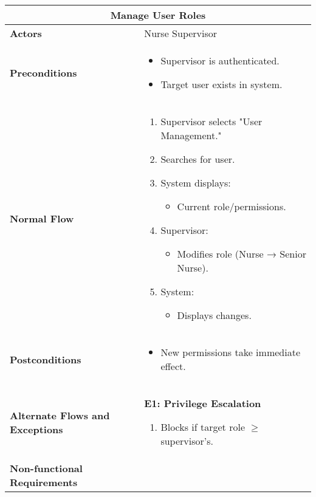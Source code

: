 \documentclass{article}
\begin{document}
\begin{longtable}{| p{5cm} | p{10cm} |}
    \hline
    \multicolumn{2}{|c|}{\textbf{Manage User Roles}} \\
    \hline
    \textbf{Actors} & Nurse Supervisor \\
    \hline
    \textbf{Preconditions} & 
    \begin{itemize}
        \item Supervisor is authenticated.
        \item Target user exists in system.
    \end{itemize} \\
    \hline
    \textbf{Normal Flow} & 
    \begin{enumerate}
        \item Supervisor selects "User Management."
        \item Searches for user.
        \item System displays:
        \begin{itemize}
            \item Current role/permissions.
        \end{itemize}
        \item Supervisor:
        \begin{itemize}
            \item Modifies role (Nurse → Senior Nurse).
        \end{itemize}
        \item System:
        \begin{itemize}
            \item Displays changes.
        \end{itemize}
    \end{enumerate} \\
    \hline
    \textbf{Postconditions} & 
    \begin{itemize}
        \item New permissions take immediate effect.
    \end{itemize} \\
    \hline
    \textbf{Alternate Flows and Exceptions} & 
    \textbf{E1: Privilege Escalation}  
    \begin{enumerate}
        \item Blocks if target role $\geq$ supervisor's.
    \end{enumerate} \\
    \hline
    \textbf{Non-functional Requirements} &  \\
    \hline
\end{longtable}
\end{document}
